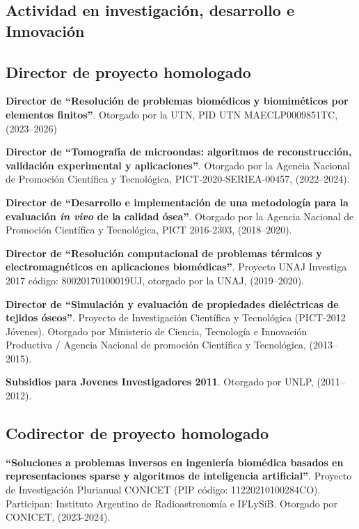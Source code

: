 \documentclass[margin,line]{res}
\begin{document}
\begin{resume}
\section{ Actividad en investigación, desarrollo e Innovación}
\vspace*{-.2in}

\subsection{ Director de proyecto homologado}

\textbf{Director de ``Resolución de problemas biomédicos y biomiméticos por elementos finitos''}. Otorgado por la UTN, PID UTN MAECLP0009851TC, (2023--2026)

\textbf{Director de ``Tomografía de microondas: algoritmos de reconstrucción, validación experimental y aplicaciones''}. Otorgado por la Agencia Nacional de Promoción Científica y Tecnológica, PICT-2020-SERIEA-00457, (2022--2024).

\textbf{Director de ``Desarrollo e implementación de una metodología para la evaluación \textit{in vivo} de la calidad ósea''}. Otorgado por la Agencia Nacional de Promoción Científica y Tecnológica, PICT 2016-2303, (2018--2020).

\textbf{Director de ``Resolución computacional de problemas térmicos y electromagnéticos en aplicaciones biomédicas''}. Proyecto UNAJ Investiga 2017 código: 80020170100019UJ, otorgado por la UNAJ, (2019--2020).

\textbf{Director de ``Simulación y evaluación de propiedades dieléctricas de tejidos óseos''}. Proyecto de Investigación Científica y Tecnológica (PICT-2012 Jóvenes). Otorgado por Ministerio de Ciencia, Tecnología e Innovación Productiva / Agencia Nacional de promoción Científica y Tecnológica, (2013--2015).

\textbf{Subsidios para Jovenes Investigadores 2011}. Otorgado por UNLP, (2011--2012).

\subsection{ Codirector de proyecto homologado}

\textbf{``Soluciones a problemas inversos en ingeniería biomédica basados en representaciones sparse y algoritmos de inteligencia artificial''}. Proyecto de Investigación Plurianual CONICET (PIP código: 11220210100284CO). Participan: Instituto Argentino de Radioastronomía e IFLySiB. Otorgado por CONICET, (2023-2024).


\end{resume}
\end{document}

